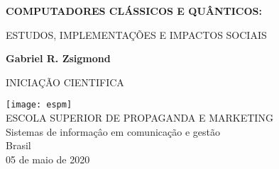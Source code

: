 \begin{titlepage}
    \begin{center}
        \vspace*{1cm}
        \LARGE
        \textbf{COMPUTADORES CLÁSSICOS E QUÂNTICOS:}
        
        \vspace{0.5cm}
        \large
        ESTUDOS, IMPLEMENTAÇÕES E IMPACTOS SOCIAIS
        
        \vspace{1.5cm}
        
        \textbf{Gabriel R. Zsigmond}
        \vfill
        
        INICIAÇÃO CIENTIFICA
        
        \vspace{0.8cm}
        
        \texttt{[image: espm]}\\
        \large
        ESCOLA SUPERIOR DE PROPAGANDA E MARKETING\\
        Sistemas de informaçâo em comunicação e gestão\\
        Brasil\\
        05 de maio de 2020\\
        
    \end{center}
\end{titlepage}